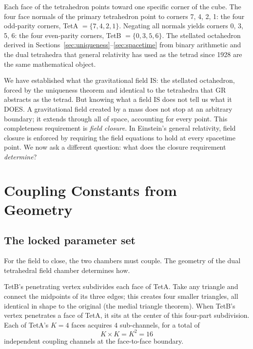 \documentclass[twocolumn]{iopjournal}
\begin{document}
Each face of the tetrahedron points toward one specific corner of the cube. The four face normals of the primary tetrahedron point to corners 7, 4, 2, 1: the four odd-parity corners, TetA $= \{7, 4, 2, 1\}$. Negating all normals yields corners 0, 3, 5, 6: the four even-parity corners, TetB $= \{0, 3, 5, 6\}$. The stellated octahedron derived in Sections~\ref{sec:uniqueness}--\ref{sec:spacetime} from binary arithmetic and the dual tetrahedra that general relativity has used as the tetrad since 1928 are the same mathematical object.


We have established what the gravitational field IS: the stellated octahedron, forced by the uniqueness theorem and identical to the tetrahedra that GR abstracts as the tetrad. But knowing what a field IS does not tell us what it DOES. A gravitational field created by a mass does not stop at an arbitrary boundary; it extends through all of space, accounting for every point. This completeness requirement is \emph{field closure}. In Einstein's general relativity, field closure is enforced by requiring the field equations to hold at every spacetime point. We now ask a different question: what does the closure requirement \emph{determine}?


\section{Coupling Constants from Geometry}
\label{sec:coupling}

\subsection{The locked parameter set}

For the field to close, the two chambers must couple. The geometry of the dual tetrahedral field chamber determines how.

TetB's penetrating vertex subdivides each face of TetA. Take any triangle and connect the midpoints of its three edges; this creates four smaller triangles, all identical in shape to the original (the medial triangle theorem). When TetB's vertex penetrates a face of TetA, it sits at the center of this four-part subdivision. Each of TetA's $K = 4$ faces acquires $4$ sub-channels, for a total of
\begin{equation}
K \times K = K^2 = 16
\end{equation}
independent coupling channels at the face-to-face boundary.
\end{document}
